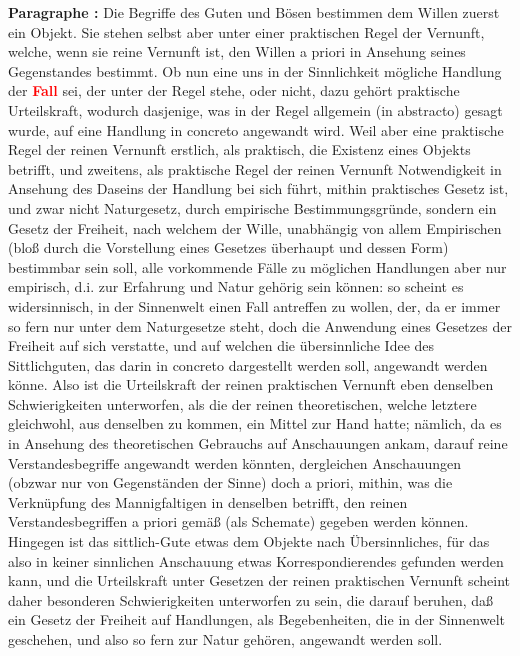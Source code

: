 \documentclass[a4paper,12pt,twoside]{book}
\newcommand{\match}[1]{\textcolor{red}{\textbf{#1}}}
\begin{document}
	\noindent\textbf{Paragraphe : }Die Begriffe des Guten und Bösen bestimmen dem Willen zuerst ein Objekt. Sie stehen selbst aber unter einer praktischen Regel der Vernunft, welche, wenn sie reine Vernunft ist, den Willen a priori in Ansehung seines Gegenstandes bestimmt. Ob nun eine uns in der Sinnlichkeit mögliche Handlung der \match{Fall} sei, der unter der Regel stehe, oder nicht, dazu gehört praktische Urteilskraft, wodurch dasjenige, was in der Regel allgemein (in abstracto) gesagt wurde, auf eine Handlung in concreto angewandt wird. Weil aber eine praktische Regel der reinen Vernunft erstlich, als praktisch, die Existenz eines Objekts betrifft, und zweitens, als praktische Regel der reinen Vernunft Notwendigkeit in Ansehung des Daseins der Handlung bei sich führt, mithin praktisches Gesetz ist, und zwar nicht Naturgesetz, durch empirische Bestimmungsgründe, sondern ein Gesetz der Freiheit, nach welchem der Wille, unabhängig von allem Empirischen (bloß durch die Vorstellung eines Gesetzes überhaupt und dessen Form) bestimmbar sein soll, alle vorkommende Fälle zu möglichen Handlungen aber nur empirisch,  d.i. zur Erfahrung und Natur gehörig sein können: so scheint es widersinnisch, in der Sinnenwelt einen Fall antreffen zu wollen, der, da er immer so fern nur unter dem Naturgesetze steht, doch die Anwendung eines Gesetzes der Freiheit auf sich verstatte, und auf welchen die übersinnliche Idee des Sittlichguten, das darin in concreto dargestellt werden soll, angewandt werden könne. Also ist die Urteilskraft der reinen praktischen Vernunft eben denselben Schwierigkeiten unterworfen, als die der reinen theoretischen, welche letztere gleichwohl, aus denselben zu kommen, ein Mittel zur Hand hatte; nämlich, da es in Ansehung des theoretischen Gebrauchs auf Anschauungen ankam, darauf reine Verstandesbegriffe angewandt werden könnten, dergleichen Anschauungen (obzwar nur von Gegenständen der Sinne) doch a priori, mithin, was die Verknüpfung des Mannigfaltigen in denselben betrifft, den reinen Verstandesbegriffen a priori gemäß (als Schemate) gegeben werden können. Hingegen ist das sittlich-Gute etwas dem Objekte nach Übersinnliches, für das also in keiner sinnlichen Anschauung etwas Korrespondierendes gefunden werden kann, und die Urteilskraft unter Gesetzen der reinen praktischen Vernunft scheint daher besonderen Schwierigkeiten unterworfen zu sein, die darauf beruhen, daß ein Gesetz der Freiheit auf Handlungen, als Begebenheiten, die in der Sinnenwelt geschehen, und also so fern zur Natur gehören, angewandt werden soll. 
	
\end{document}
